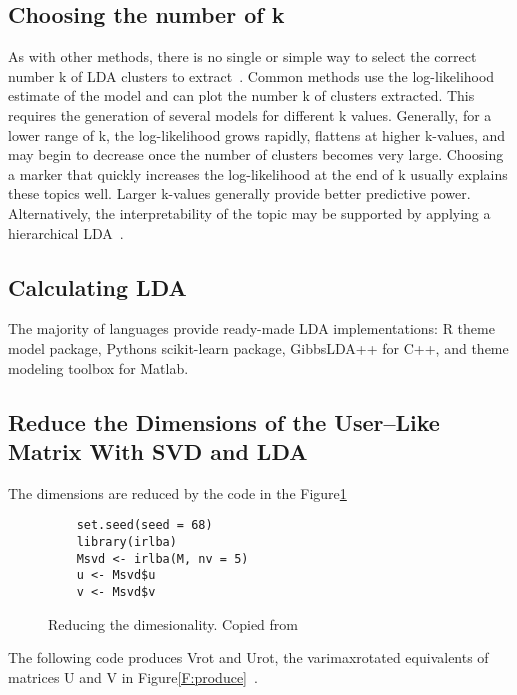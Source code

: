 \subsection{Choosing the number of k~\cite{hid515-12}}

As with other methods, there is no single or simple way to select 
the correct number k of LDA clusters to extract~\cite{hid515-12}. 
Common methods use
 the log-likelihood estimate of the model and can plot the number k
 of clusters extracted. This requires the generation of several 
models for different k values. Generally, for a lower range of k, 
the log-likelihood grows rapidly, flattens at higher k-values, and
 may begin to decrease once the number of clusters becomes very 
large. Choosing a marker that quickly increases the log-likelihood
 at the end of k usually explains these topics well. Larger 
k-values generally provide better predictive power. Alternatively,
 the interpretability of the topic may be supported by applying a 
hierarchical LDA~\cite{hid515-12}.

\subsection{Calculating LDA~\cite{hid515-12}}

The majority of languages provide ready-made LDA implementations: 
R theme model package, Pythons scikit-learn package, 
GibbsLDA++ for C++, and theme modeling toolbox for Matlab.

\subsection{Reduce the Dimensions of the
User–Like Matrix With SVD and LDA~\cite{hid515-12}}

The dimensions are reduced by the code in the Figure\ref{F:reduce}

\begin{figure}[htb]
\begin{footnotesize}
\begin{verbatim}
    set.seed(seed = 68)
    library(irlba)
    Msvd <- irlba(M, nv = 5)
    u <- Msvd$u
    v <- Msvd$v
\end{verbatim}
\end{footnotesize}
\caption{Reducing the dimesionality. Copied from~\cite{hid515-12}}
\label{F:reduce}
\end{figure}


The following code produces Vrot and Urot, the varimaxrotated
equivalents of matrices U and V in Figure\ref{F:produce}~\cite{hid515-12}.

